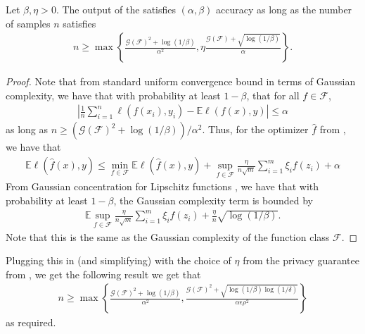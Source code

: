     
    \begin{lemma}\label{lem:accuracy_perturbed}
        Let $\beta, \eta > 0$.  
        The output of the  satisfies $(\alpha, \beta)$ accuracy as long as the number of samples $n$ satisfies  
        \begin{align}
            n \geq \max\left\{ \frac{\mathcal{G}( \mathcal{F} )^2 + \log(1/\beta)}{\alpha^2}  , \eta  \frac{\mathcal{G}( \mathcal{F} ) + \sqrt{ \log(1/\beta) }}{\alpha}    \right\} .
        \end{align}  
    \end{lemma}
    \begin{proof}
        Note that from standard uniform convergence bound in terms of Gaussian complexity, we have that with probability at least $1 - \beta $, that for all $f \in \mathcal{F}$,
        \begin{align}
            \left| \frac{1}{n} \sum_{i=1}^{n} \ell(f(x_i) , y_i ) - \mathbb{E} \ell(f(x) , y ) \right| \leq \alpha
        \end{align} 
        as long as $ n \geq (\mathcal{G}( \mathcal{F} )^2 + \log(1/\beta)) / \alpha^2 $.
        Thus, for the optimizer $\hat{f}$  from , we have that 
        \begin{align}
            \mathbb{E} \ell( \hat{f}(x) , y ) \leq \min_{f \in \mathcal{F}}  \mathbb{E} \ell( \hat{f}(x) , y ) + \sup_{f \in \mathcal{F}  } \frac{\eta}{ n \sqrt{m} } \sum_{i=1}^{m} \xi_i f(z_i) + \alpha
        \end{align}  
        From Gaussian concentration for Lipschitz functions \citep[Section 10.5]{boucheron2013concentration}, we have that with probability at least $1 - \beta $, the Gaussian complexity term is bounded by
        \begin{align}
            \mathbb{E} \sup_{f \in \mathcal{F}  } \frac{\eta}{ n \sqrt{m} } \sum_{i=1}^{m} \xi_i f(z_i) + \frac{\eta}{n} \sqrt{\log(1/\beta)} . 
        \end{align}
        Note that this is the same as the Gaussian complexity of the function class $\mathcal{F}$.
    \end{proof}

    Plugging this in (and simplifying) with the choice of $\eta$ from  the privacy guarantee from , we get the following result we get that 
    \begin{align}
        n \geq \max \left\{ \frac{\mathcal{G}( \mathcal{F} )^2 + \log(1/\beta) }{\alpha^2} ,  \frac{\mathcal{G}( \mathcal{F} )^2 + \sqrt{ \log(1/\beta) \log(1/\delta) }   } { \alpha \epsilon \rho^2 }    \right\}
    \end{align}
    as required.





    




